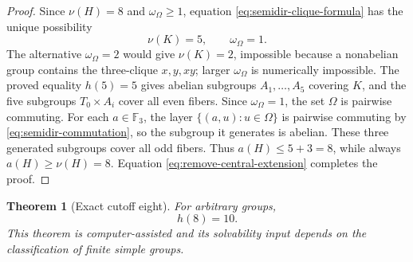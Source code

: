 \documentclass[11pt]{article}
\newtheorem{theorem}{Theorem}[section]
\theoremstyle{remark}
\newcommand{\nuG}{\nu}
\newcommand{\aG}{a}
\newcommand{\F}{\mathbb F}
\begin{document}
\begin{proof}
Since $\nuG(H)=8$ and $\omega_\Omega\ge1$, equation
\eqref{eq:semidir-clique-formula} has the unique possibility
\[
 \nuG(K)=5,\qquad \omega_\Omega=1.
\]
The alternative $\omega_\Omega=2$ would give $\nuG(K)=2$, impossible
because a nonabelian group contains the three-clique $x,y,xy$; larger
$\omega_\Omega$ is numerically impossible.  The proved equality $h(5)=5$
gives abelian subgroups $A_1,\ldots,A_5$ covering $K$, and the five
subgroups $T_0\times A_i$ cover all even fibers.  Since
$\omega_\Omega=1$, the set $\Omega$ is pairwise commuting.  For each
$a\in\F_3$, the layer $\{(a,u):u\in\Omega\}$ is pairwise commuting by
\eqref{eq:semidir-commutation}, so the subgroup it generates is abelian.
These three generated subgroups cover all odd fibers.  Thus
$\aG(H)\le5+3=8$, while always $\aG(H)\ge\nuG(H)=8$.  Equation
\eqref{eq:remove-central-extension} completes the proof.
\end{proof}

\begin{theorem}[Exact cutoff eight]
\label{thm:h8-exact}
For arbitrary groups,
\[
 \boxed{h(8)=10.}
\]
This theorem is computer-assisted and its solvability input depends on the
classification of finite simple groups.
\end{theorem}
\end{document}
